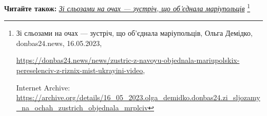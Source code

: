  
 
 
 
 


\textbf{Читайте також:} \href{https://archive.org/details/16_05_2023.olga_demidko.donbas24.zi_sljozamy_na_ochah_zustrich_objednala_mrplciv}{\emph{Зі сльозами на очах — зустріч, що об'єднала маріупольців}}%
\footnote{Зі сльозами на очах — зустріч, що об'єднала маріупольців, Ольга Демідко, donbas24.news, 16.05.2023, \par%
\url{https://donbas24.news/news/zustric-z-navoyu-objednala-mariupolskix-pereselenciv-z-riznix-mist-ukrayini-video}, \par%
Internet Archive: \url{https://archive.org/details/16_05_2023.olga_demidko.donbas24.zi_sljozamy_na_ochah_zustrich_objednala_mrplciv}%
}
